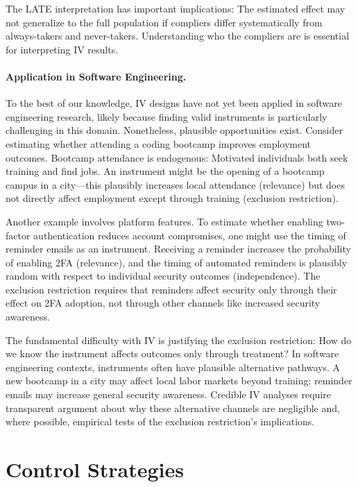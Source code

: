 The LATE interpretation has important implications: The estimated effect may not generalize to the full population if compliers differ systematically from always-takers and never-takers.
Understanding who the compliers are is essential for interpreting IV results.

\paragraph{Application in Software Engineering.}
To the best of our knowledge, IV designs have not yet been applied in software engineering research, likely because finding valid instruments is particularly challenging in this domain.
Nonetheless, plausible opportunities exist.
Consider estimating whether attending a coding bootcamp improves employment outcomes.
Bootcamp attendance is endogenous: Motivated individuals both seek training and find jobs.
An instrument might be the opening of a bootcamp campus in a city---this plausibly increases local attendance (relevance) but does not directly affect employment except through training (exclusion restriction).

Another example involves platform features.
To estimate whether enabling two-factor authentication reduces account compromises, one might use the timing of reminder emails as an instrument.
Receiving a reminder increases the probability of enabling 2FA (relevance), and the timing of automated reminders is plausibly random with respect to individual security outcomes (independence).
The exclusion restriction requires that reminders affect security only through their effect on 2FA adoption, not through other channels like increased security awareness.

The fundamental difficulty with IV is justifying the exclusion restriction: How do we know the instrument affects outcomes only through treatment?
In software engineering contexts, instruments often have plausible alternative pathways.
A new bootcamp in a city may affect local labor markets beyond training; reminder emails may increase general security awareness.
Credible IV analyses require transparent argument about why these alternative channels are negligible and, where possible, empirical tests of the exclusion restriction's implications.


\section{Control Strategies}
\label{sec:control}

